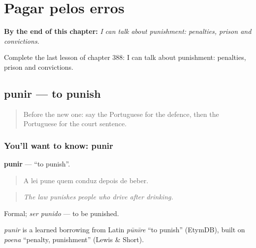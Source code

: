 
\chapter{Pagar pelos erros}
\label{ch:pt-pagar-pelos-erros}

\begin{chapteropening}
\textbf{By the end of this chapter:} \emph{I can talk about punishment: penalties, prison and convictions.}

Complete the last lesson of chapter 388: I can talk about punishment: penalties, prison and convictions.
\end{chapteropening}

\section[punir]{punir — to punish}

\label{lesson:PT-C388-punir}



\begin{quote}
Before the new one: say the Portuguese for the defence, then the Portuguese for the court sentence.
\end{quote}

\subsection*{You'll want to know: punir}
\textbf{punir} — \textquotedblleft{}to punish\textquotedblright{}.

\begin{quote}
A lei pune quem conduz depois de beber.
\end{quote}

\begin{quote}
\emph{The law punishes people who drive after drinking.}
\end{quote}

Formal; \emph{ser punido} — to be punished.

\begin{cousinweb}
\emph{punir} is a learned borrowing from Latin \emph{pūnīre} \textquotedblleft{}to punish\textquotedblright{} (EtymDB), built on \emph{poena} \textquotedblleft{}penalty, punishment\textquotedblright{} (Lewis \& Short).
\end{cousinweb}

